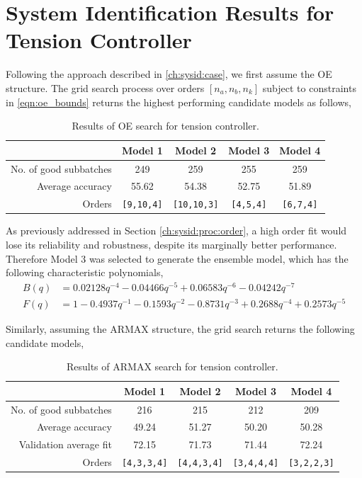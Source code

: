 \chapter{System Identification Results for Tension Controller} \label{apdx:sysid_kt}

Following the approach described in \ref{ch:sysid:case}, we first assume the OE structure. The grid search process over orders $[n_a, n_b, n_k]$ subject to constraints in \eqref{eqn:oe_bounds} returns the highest performing candidate models as follows,

\begin{table}[h]
    \centering
    \begin{tabular}{r|cccc}
         & Model 1 & Model 2 & Model 3 & Model 4 \\ \hline
         No. of good subbatches & 249 & 259 & 255 & 259 \\
         Average accuracy & 55.62 & 54.38 & 52.75 & 51.89 \\
         Orders & \texttt{[9,10,4]} & \texttt{[10,10,3]} & \texttt{[4,5,4]} & \texttt{[6,7,4]} \\ \hline
    \end{tabular}
    \caption{Results of OE search for tension controller.}
    \label{tab:kt_oe}
\end{table}

As previously addressed in Section \ref{ch:sysid:proc:order}, a high order fit would lose its reliability and robustness, despite its marginally better performance. Therefore Model 3 was selected to generate the ensemble model, which has the following characteristic polynomials, 
\begin{equation*}
    \begin{split}
        B(q) & = 0.02128 q^{-4} - 0.04466 q^{-5} + 0.06583 q^{-6} - 0.04242 q^{-7} \\            
        F(q) & = 1 - 0.4937 q^{-1} - 0.1593 q^{-2} - 0.8731 q^{-3} + 0.2688 q^{-4} + 0.2573 q^{-5}
    \end{split}
\end{equation*}

Similarly, assuming the ARMAX structure, the grid search returns the following candidate models, 
\begin{table}[ht]
    \centering
    \begin{tabular}{r|cccc}
         & Model 1 & Model 2 & Model 3 & Model 4 \\ \hline
         No. of good subbatches & 216 & 215 & 212 & 209 \\
         Average accuracy & 49.24 & 51.27 & 50.20 & 50.28 \\
         Validation average fit & 72.15 & 71.73 & 71.44 & 72.24 \\
         Orders & \texttt{[4,3,3,4]} & \texttt{[4,4,3,4]} & \texttt{[3,4,4,4]} & \texttt{[3,2,2,3]} \\ \hline
    \end{tabular}
    \caption{Results of ARMAX search for tension controller.}
    \label{tab:kt_armax}
\end{table}

